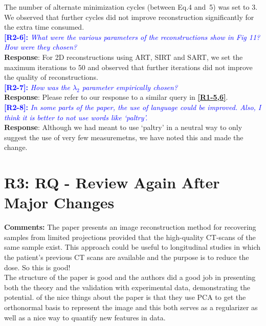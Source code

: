\documentclass[11pt]{article}
\begin{document}
The number of alternate minimization cycles (between Eq.4 and~5) was set to 3. We observed that further cycles did not improve reconstruction significantly for the extra time consumed.
\\

\vspace{0.5cm}\textcolor{blue}{\textbf{[R2-6]:} \textit{What were the various parameters of the reconstructions show in Fig 11? How were they chosen?
}}\\

\textbf{Response}: For 2D reconstructions using ART, SIRT and SART, we set the maximum iterations to 50 and observed that further iterations did not improve the quality of reconstructions.\\

\vspace{0.5cm}\textcolor{blue}{\textbf{[R2-7]:} \textit{How was the $\lambda_2$ parameter empirically chosen?
}}\\

\textbf{Response}: Please refer to our response to a similar query in \textcolor{blue}{\textbf{\hyperlink{hyperparameters}{[R1-5,6]}}}.\\

\vspace{0.5cm}\textcolor{blue}{\textbf{[R2-8]:} \textit{In some parts of the paper, the use of language could be improved. Also, I think it is better to not use words like `paltry'.}}\\

\textbf{Response}: Although we had meant to use `paltry' in a neutral way to only suggest the use of very few measuremetns, we  have noted this and made the change.\\

\section{R3: RQ - Review Again After Major Changes}

\textbf{Comments:} The paper presents an image reconstruction method for recovering samples from limited projections provided that the high-quality CT-scans of the same sample exist. This approach could be useful to longitudinal studies in which the patient's previous CT scans are available and the purpose is to reduce the dose. So this is good!\\

The structure of the paper is good and the authors did a good job in presenting both the theory and the validation with experimental data, demonstrating the potential. of the nice things about the paper is that they use PCA to get the orthonormal basis to represent the image and this both serves as a regularizer as well as a nice way to quantify new features in data.
\\
\end{document}
